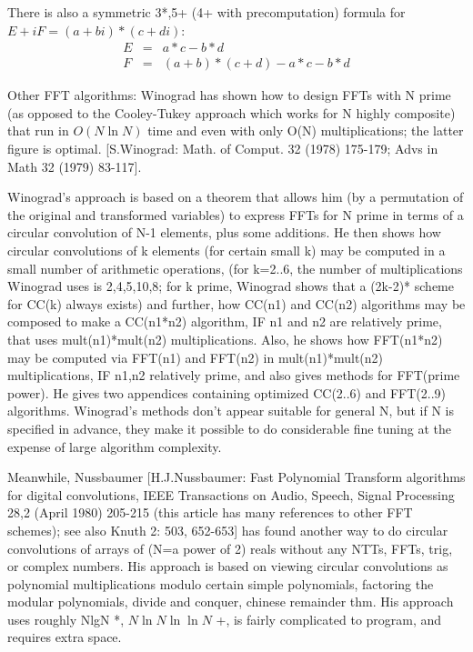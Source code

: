 There is also a symmetric 3*,5+ (4+ with precomputation) formula for  
$E+iF = (a+bi)*(c+di)$:
\begin{eqnarray}
  E & = & a*c-b*d\\
  F & = & (a+b)*(c+d)-a*c-b*d
\end{eqnarray}

Other FFT algorithms: Winograd has shown how to design FFTs with N prime
(as opposed to the Cooley-Tukey approach which works for N highly composite)
that run in $O(N \ln N)$ time and even with only O(N) multiplications;
the latter figure is optimal. [S.Winograd: Math. of Comput. 32 (1978) 175-179;
Advs in Math 32 (1979) 83-117].

Winograd's approach is based on a theorem that allows him (by a permutation
of the original and transformed variables) to express FFTs for N prime
in terms of a circular convolution of N-1 elements, plus some additions.
He then shows how circular convolutions of k elements (for certain small k)
may be computed in a small number of arithmetic operations, (for k=2..6,
the number of multiplications Winograd uses is 2,4,5,10,8; for k prime,
Winograd shows that a (2k-2)* scheme for CC(k) always exists) and further, how
CC(n1) and CC(n2) algorithms may be composed to make a CC(n1*n2) algorithm, IF
n1 and n2 are relatively prime, that uses mult(n1)*mult(n2) multiplications.
Also, he shows how FFT(n1*n2) may be computed via FFT(n1) and FFT(n2)
in mult(n1)*mult(n2) multiplications, IF n1,n2 relatively prime, and
also gives methods for FFT(prime power). He gives two appendices
containing optimized CC(2..6) and FFT(2..9) algorithms. Winograd's methods
don't appear suitable for general N, but if N is specified in advance, they
make it possible to do considerable fine tuning at the expense of
large algorithm complexity.

Meanwhile, Nussbaumer [H.J.Nussbaumer: Fast Polynomial Transform algorithms
for digital convolutions, IEEE Transactions on Audio, Speech, Signal Processing
28,2 (April 1980) 205-215 (this article has many references to other FFT
schemes); see also Knuth 2: 503, 652-653] has found another way to do circular
convolutions of arrays of (N=a power of 2) reals without any NTTs, FFTs, trig,
or complex numbers. His approach is based on viewing circular convolutions
as polynomial multiplications modulo certain simple polynomials, factoring the
modular polynomials, divide and conquer, chinese remainder thm.
His approach uses roughly NlgN *,
$N \ln N \ln \ln N$ +, is fairly complicated to program, and requires extra space.

